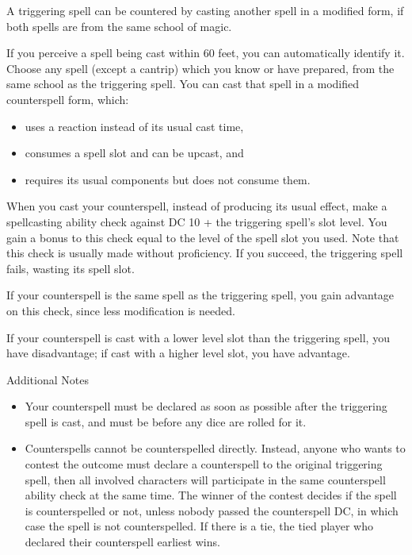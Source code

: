 \documentclass[letterpaper,twocolumn,openany,nodeprecatedcode,bg=print]{dndbook}
\begin{document}
A triggering spell can be countered by casting another spell in a modified form, if both spells are from the same school of magic.

If you perceive a spell being cast within 60 feet, you can automatically identify it.
Choose any spell (except a cantrip) which you know or have prepared, from the same school as the triggering spell.
You can cast that spell in a modified counterspell form, which: 
\begin{itemize}
\item uses a reaction instead of its usual cast time,
\item consumes a spell slot and can be upcast, and 
\item requires its usual components but does not consume them.
\end{itemize}


\noindent When you cast your counterspell, instead of producing its usual effect, make a spellcasting ability check against DC 10 + the triggering spell's slot level. 
You gain a bonus to this check equal to the level of the spell slot you used. 
Note that this check is usually made without proficiency. 
If you succeed, the triggering spell fails, wasting its spell slot.

If your counterspell is the same spell as the triggering spell, you gain advantage on this check, since less modification is needed. 

If your counterspell is cast with a lower level slot than the triggering spell, you have disadvantage; if cast with a higher level slot, you have advantage.

\begin{DndComment}{Additional Notes}
\begin{itemize}
\item Your counterspell must be declared as soon as possible after the triggering spell is cast, and must be before any dice are rolled for it.
\item Counterspells cannot be counterspelled directly. Instead, anyone who wants to contest the outcome must declare a counterspell to the original triggering spell, then all involved characters will participate in the same counterspell ability check at the same time. The winner of the contest decides if the spell is counterspelled or not, unless nobody passed the counterspell DC, in which case the spell is not counterspelled. If there is a tie, the tied player who declared their counterspell earliest wins.
\end{itemize}
\end{DndComment}
\end{document}

